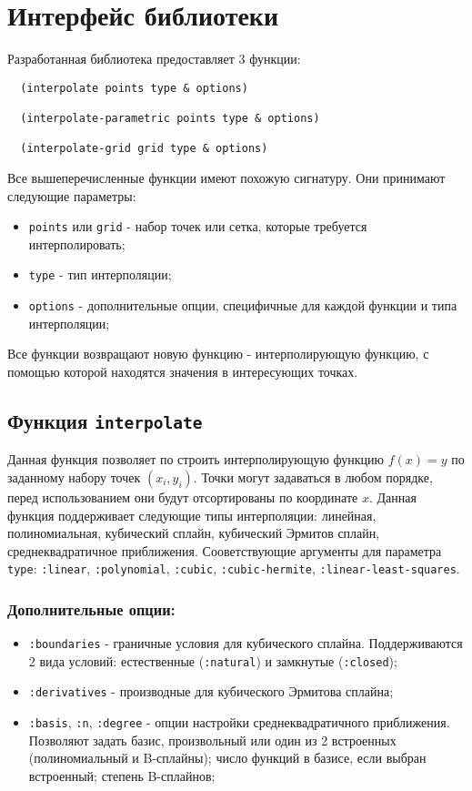 \section{Интерфейс библиотеки}

Разработанная библиотека предоставляет 3 функции:

\begin{verbatim}
  (interpolate points type & options)

  (interpolate-parametric points type & options)

  (interpolate-grid grid type & options)
\end{verbatim}

Все вышеперечисленные функции имеют похожую сигнатуру. Они принимают следующие параметры:

\begin{itemize}
\item \texttt{points} или \texttt{grid} - набор точек или сетка, которые требуется интерполировать;
\item \texttt{type} - тип интерполяции;
\item \texttt{options} - дополнительные опции, специфичные для каждой функции и типа интерполяции;
\end{itemize}

Все функции возвращают новую функцию - интерполирующую функцию, с помощью которой находятся значения в интересующих точках.

\subsection{Функция \texttt{interpolate}}

Данная функция позволяет по строить интерполирующую функцию $f(x) = y$ по заданному набору точек $(x_i, y_i)$. Точки могут задаваться в любом порядке, перед использованием они будут отсортированы по координате $x$. Данная функция поддерживает следующие типы интерполяции: линейная, полиномиальная, кубический сплайн, кубический Эрмитов сплайн, среднеквадратичное приближения. Сооветствующие аргументы для параметра \texttt{type}: \texttt{:linear}, \texttt{:polynomial}, \texttt{:cubic}, \texttt{:cubic-hermite}, \texttt{:linear-least-squares}.

\subsubsection{Дополнительные опции:}
\begin{itemize}
\item \texttt{:boundaries} - граничные условия для кубического сплайна. Поддерживаются 2 вида условий: естественные (\texttt{:natural})
                             и замкнутые (\texttt{:closed});
\item \texttt{:derivatives} - производные для кубического Эрмитова сплайна;
\item \texttt{:basis}, \texttt{:n}, \texttt{:degree} - опции настройки среднеквадратичного приближения. Позволяют задать базис, произвольный или один из 2 встроенных (полиномиальный и B-сплайны); число функций в базисе, если выбран встроенный; степень B-сплайнов;
\end{itemize}

